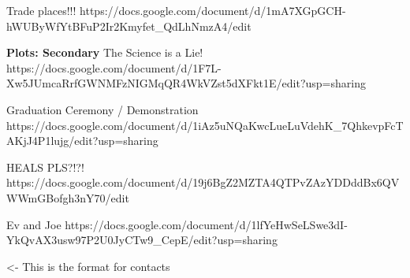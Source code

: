 \documentclass[char]{GL2020}
\begin{document}
Trade places!!!
https://docs.google.com/document/d/1mA7XGpGCH-hWUByWfYtBFuP2Ir2Kmyfet_QdLhNmzA4/edit



\textbf{Plots: Secondary}
The Science is a Lie!
https://docs.google.com/document/d/1F7L-Xw5JUmcaRrfGWNMFzNIGMqQR4WkVZst5dXFkt1E/edit?usp=sharing

Graduation Ceremony / Demonstration
https://docs.google.com/document/d/1iAz5uNQaKwcLueLuVdehK_7QhkevpFcTAKjJ4P1lujg/edit?usp=sharing

HEALS PLS?!?!
https://docs.google.com/document/d/19j6BgZ2MZTA4QTPvZAzYDDddBx6QVWWmGBofgh3nY70/edit

Ev and Joe
https://docs.google.com/document/d/1lfYeHwSeLSwe3dI-YkQvAX3usw97P2U0JyCTw9_CepE/edit?usp=sharing


\begin{itemz}[Goals]
	\item 
\end{itemz}

\begin{itemz}[Notes]
	\item 
\end{itemz}

\begin{contacts}
	\contact{\cTest{}} <- This is the format for contacts 
\end{contacts}
\end{document}
